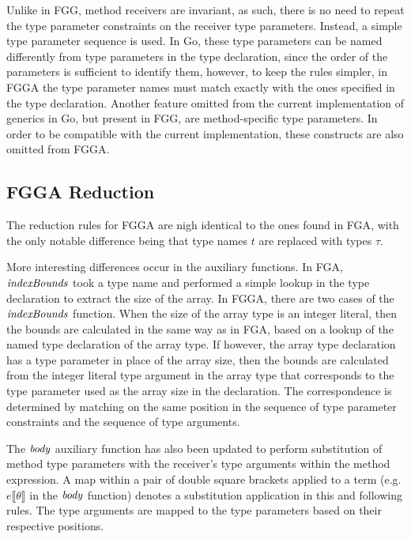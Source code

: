 Unlike in FGG, method receivers are invariant, as such, there is no need to
repeat the type parameter constraints on the receiver type parameters. Instead,
a simple type parameter sequence is used. In Go, these type parameters can be
named differently from type parameters in the type declaration, since the order
of the parameters is sufficient to identify them, however, to keep the rules
simpler, in FGGA the type parameter names must match exactly with the ones
specified in the type declaration. Another feature omitted from the current
implementation of generics in Go, but present in FGG, are method-specific type
parameters. In order to be compatible with the current implementation, these
constructs are also omitted from FGGA.



\subsection{FGGA Reduction}

The reduction rules for FGGA are nigh identical to the ones found in FGA, with
the only notable difference being that type names $t$ are replaced with types
$\tau$.

More interesting differences occur in the auxiliary functions. In FGA,
$\mathit{indexBounds}$ took a type name and performed a simple lookup in the type
declaration to extract the size of the array. In FGGA, there are two cases of
the $\mathit{indexBounds}$ function. When the size of the array type is an integer
literal, then the bounds are calculated in the same way as in FGA, based on a
lookup of the named type declaration of the array type. If however, the array
type declaration has a type parameter in place of the array size, then the
bounds are calculated from the integer literal type argument in the array type
that corresponds to the type parameter used as the array size in the
declaration. The correspondence is determined by matching on the same position
in the sequence of type parameter constraints and the sequence of type
arguments.

The $\mathit{body}$ auxiliary function has also been updated to perform substitution of
method type parameters with the receiver's type arguments within the method
expression. A map within a pair of double square brackets applied to a term
(e.g. $e\llbracket\theta\rrbracket$ in the $\mathit{body}$ function) denotes a
substitution application in this and following rules. The type arguments are
mapped to the type parameters based on their respective positions.

